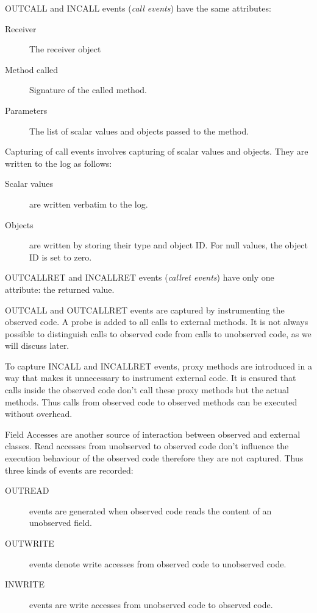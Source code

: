 OUTCALL and INCALL events (\emph {call events})  have the same attributes:

\begin{description}
 \item [Receiver] The receiver object
 \item [Method called] Signature of the called method.
 \item [Parameters] The list of scalar values and objects passed to the method.
\end{description}

Capturing of call events involves capturing of scalar values and objects. They are written to the log as follows:

\begin{description}
 \item [Scalar values] are written verbatim to the log.
 \item [Objects] are written by storing their type and object ID. For null values, the object ID is set to zero. 
\end{description}

OUTCALLRET and INCALLRET events (\emph{callret events}) have only one attribute: the returned value.

OUTCALL and OUTCALLRET events are captured by instrumenting the observed code. A probe is added to all calls to external methods. It is not always possible to distinguish calls to observed code from calls to unobserved code, as we will discuss later.

To capture INCALL and INCALLRET events, proxy methods are introduced in a way that makes it unnecessary to instrument external code. It is ensured that calls inside the observed code don't call these proxy methods but the actual methods. Thus calls from observed code to observed methods can be executed without overhead.

Field Accesses are another source of interaction between observed and external classes. Read accesses from unobserved to observed code don't influence the execution behaviour of the observed code therefore they are not captured. Thus three kinds of events are recorded:

\begin{description}
 \item [OUTREAD] events are generated when observed code reads the content of an unobserved field.
 \item [OUTWRITE] events denote write accesses from observed code to unobserved code.
 \item [INWRITE] events are write accesses from unobserved code to observed code.
\end{description}

